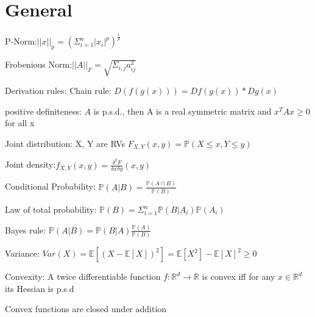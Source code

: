 \section{General}
P-Norm:$||x||_p = (\Sigma_{i=1}^n |x_i|^p)^{\frac{1}{p}}$

Frobenious Norm:$||A||_F = \sqrt{\Sigma_{i,j} a_{ij}^2}$

Derivation rules: Chain rule: $D(f(g(x))) = Df(g(x))*Dg(x)$

positive definiteness: $A$ is p.s.d., then A is a real symmetric matrix and $x^TAx \geq 0$ for all x

Joint distribution: X, Y are RVs $F_{X,Y}(x,y) = \mathbb{P}(X \leq x, Y\leq y)$

Joint density:$ f_{X,Y}(x, y) = \frac{\delta^2 F}{\delta x \delta y}(x, y)$

Conditional Probability: $\mathbb{P}(A|B) = \frac{\mathbb{P}(A \cap B)}{\mathbb{P}(B)}$

Law of total probability: $\mathbb{P}(B) = \Sigma_{i=1}^n \mathbb{P}(B|A_i)\mathbb{P}(A_i)$

Bayes rule: $\mathbb{P}(A|B) = \mathbb{P}(B|A)\frac{\mathbb{P}(A)}{\mathbb{P}(B)}$

Variance: $Var(X) = \mathbb{E}[(X - \mathbb{E}[X])^2] = \mathbb{E}[X^2] - \mathbb{E}[X]^2 \geq 0$

Convexity: A twice differentiable function $f: \mathbb{R}^d \rightarrow \mathbb{R}$ is convex iff for any $x \in \mathbb{R}^d$ its Hessian is p.s.d

Convex functions are closed under addition